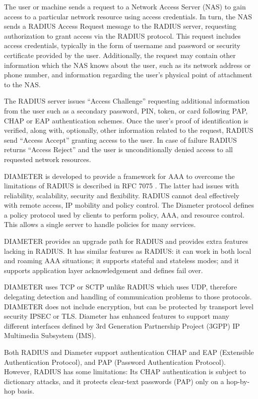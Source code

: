 \begin{multicols}{2}
The user or machine sends a request to a Network Access Server (NAS) to gain access to a particular network resource using access credentials. In turn, the NAS sends a RADIUS Access Request message to the RADIUS server, requesting authorization to grant access via the RADIUS protocol. This request includes access credentials, typically in the form of username and password or security certificate provided by the user. Additionally, the request may contain other information which the NAS knows about the user, such as its network address or phone number, and information regarding the user's physical point of attachment to the NAS. 

The RADIUS server issues ``Access Challenge'' requesting additional information from the user such as a secondary password, PIN, token, or card following PAP, CHAP or EAP \cite{chap2-key9} authentication schemes. Once the user's proof of identification is verified, along with, optionally, other information related to the request, RADIUS send ``Access Accept'' granting access to the user. In case of failure RADIUS returns ``Access Reject'' and the user is unconditionally denied access to all requested network resources.

DIAMETER is developed to provide a framework for AAA to overcome the limitations of RADIUS is described in RFC 7075 \cite{chap2-key24}. The latter had issues with reliability, scalability, security and flexibility. RADIUS cannot deal effectively with remote access, IP mobility and policy control. The Diameter protocol defines a policy protocol used by clients to perform policy, AAA, and resource control. This allows a single server to handle policies for many services.

DIAMETER provides an upgrade path for RADIUS and provides extra features lacking in RADIUS. It has similar features as RADIUS: it can work in both local and roaming AAA situations; it supports stateful and stateless modes; and it supports application layer acknowledgement and defines fail over.

DIAMETER uses TCP or SCTP unlike RADIUS which uses UDP, therefore delegating detection and handling of communication problems to those protocols. DIAMETER does not include encryption, but can be protected by transport level security IPSEC or TLS. Diameter has enhanced features to support many different interfaces defined by 3rd Generation Partnership Project (3GPP) IP Multimedia Subsystem (IMS).

Both RADIUS and Diameter support authentication CHAP and EAP (Extensible Authentication Protocol), and PAP (Password Authentication Protocol). However, RADIUS has some limitations: Its CHAP authentication is subject to dictionary attacks, and it protects clear-text passwords (PAP) only on a hop-by-hop basis. 


\end{multicols}
